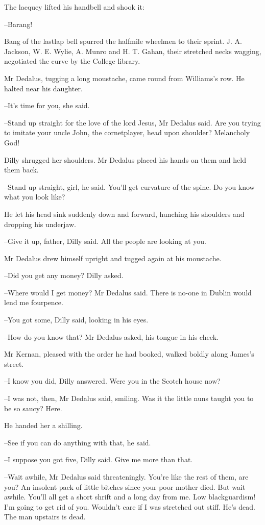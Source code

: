 The lacquey lifted his handbell and shook it:

--Barang!

Bang of the lastlap bell spurred the halfmile wheelmen to their sprint.
J. A. Jackson, W. E. Wylie, A. Munro and H. T. Gahan, their stretched
necks wagging, negotiated the curve by the College library.

Mr Dedalus, tugging a long moustache, came round from Williams's
row. He halted near his daughter.

--It's time for you, she said.

--Stand up straight for the love of the lord Jesus, Mr Dedalus said. Are
you trying to imitate your uncle John, the cornetplayer, head upon
shoulder? Melancholy God!

Dilly shrugged her shoulders. Mr Dedalus placed his hands on them
and held them back.

--Stand up straight, girl, he said. You'll get curvature of the spine.
Do you know what you look like?

He let his head sink suddenly down and forward, hunching his
shoulders and dropping his underjaw.

--Give it up, father, Dilly said. All the people are looking at you.

Mr Dedalus drew himself upright and tugged again at his moustache.

--Did you get any money? Dilly asked.

--Where would I get money? Mr Dedalus said. There is no-one in Dublin
would lend me fourpence.

--You got some, Dilly said, looking in his eyes.

--How do you know that? Mr Dedalus asked, his tongue in his cheek.

Mr Kernan, pleased with the order he had booked, walked boldly
along James's street.

--I know you did, Dilly answered. Were you in the Scotch house now?

--I was not, then, Mr Dedalus said, smiling. Was it the little nuns
taught you to be so saucy? Here.

He handed her a shilling.

--See if you can do anything with that, he said.

--I suppose you got five, Dilly said. Give me more than that.

--Wait awhile, Mr Dedalus said threateningly. You're like the rest of
them, are you? An insolent pack of little bitches since your poor mother
died. But wait awhile. You'll all get a short shrift and a long day from
me. Low blackguardism! I'm going to get rid of you. Wouldn't care if I
was stretched out stiff. He's dead. The man upstairs is dead.

